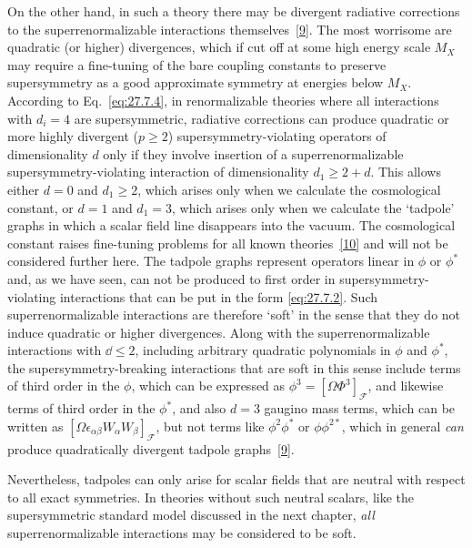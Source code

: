 On the other hand, in such a theory there may be divergent radiative
corrections to the superrenormalizable interactions
themselves~\hyperref[ch27-ref-9]{[9]}. The most worrisome are quadratic (or
higher) divergences, which if cut off at some high energy scale \(M_X\) may
require a fine-tuning of the bare coupling constants to preserve
supersymmetry as a good approximate symmetry at energies below \(M_X\).
According to Eq.~\eqref{eq:27.7.4}, in renormalizable theories where all
interactions with \(d_i=4\) are supersymmetric, radiative corrections can
produce quadratic or more highly divergent (\(p\geq2\))
supersymmetry-violating operators of dimensionality \(d\) only if they
involve insertion of a superrenormalizable supersymmetry-violating
interaction of dimensionality \(d_1\geq2+d\). This allows either \(d=0\)
and \(d_1\geq2\), which arises only when we calculate the cosmological
constant, or \(d=1\) and \(d_1=3\), which arises only when we calculate the
`tadpole' graphs in which a scalar field line disappears into the vacuum.
The cosmological constant raises fine-tuning problems for all known
theories~\hyperref[ch27-ref-10]{[10]} and will not be considered further
here. The tadpole graphs represent operators linear in \(\phi\) or \(\phi^*\)
and, as we have seen, can not be produced to first order in
supersymmetry-violating interactions that can be put in the form
\eqref{eq:27.7.2}. Such superrenormalizable interactions are therefore
`soft' in the sense that they do not induce quadratic or higher divergences.
Along with the superrenormalizable interactions with \(\dd\leq2\), including
arbitrary quadratic polynomials in \(\phi\) and \(\phi^*\), the
supersymmetry-breaking interactions that are soft in this sense include
terms of third order in the \(\phi\), which can be expressed as
\(\phi^3=[\Omega\Phi^3]_{\mathcal{F}}\), and likewise terms of third order
in the \(\phi^*\), and also \(d=3\) gaugino mass terms, which can be written
as \([\Omega\epsilon_{\alpha\beta}W_\alpha W_\beta]_{\mathcal{F}}\), but
not terms like \(\phi^2\phi^*\) or \(\phi\phi^{2*}\), which in general
\emph{can} produce quadratically divergent tadpole
graphs~\hyperref[ch27-ref-9]{[9]}.

Nevertheless, tadpoles can only arise for scalar fields that are neutral
with respect to all exact symmetries. In theories without such neutral
scalars, like the supersymmetric standard model discussed in the next
chapter, \emph{all} superrenormalizable interactions may be considered to be
soft.
